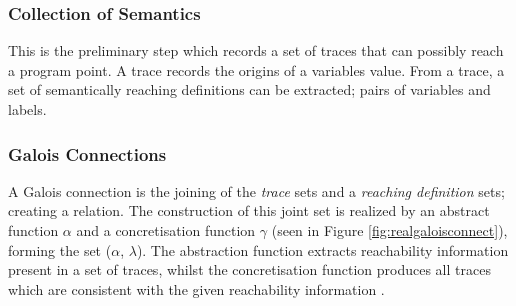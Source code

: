 \documentclass[12pt, a4paper]{report}
\theoremstyle{definition}
\theoremstyle{definition}%
\theoremstyle{definition}%
\theoremstyle{definition}%
\theoremstyle{definition}%
\theoremstyle{definition}%
\begin{document}
{    \subsubsection*{Collection of Semantics}
    \par This is the preliminary step which records a set of traces that can possibly reach a program point. A trace records the origins of a variables value.
    From a trace, a set of semantically reaching definitions can be extracted; pairs of variables and labels.
    
    \subsubsection*{Galois Connections}
    \par A Galois connection is the joining of the \textit{trace} sets and a \textit{reaching definition} sets; creating a relation. The construction of this joint set is realized by an abstract function $\alpha$
    and a concretisation function $\gamma$ (seen in Figure \ref{fig:realgaloisconnect}), forming the set ($\alpha$, $\lambda$). The abstraction function extracts reachability information present 
    in a set of traces, whilst the concretisation function produces all traces which are consistent with the given reachability information \cite[pp.14--15]{nielson2004principlesofPA}.
    
    \begin{figure}
        \centering 
\end{figure}}
\end{document}
